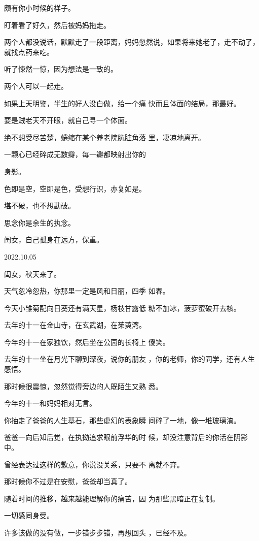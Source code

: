 \documentclass{article}
\begin{document}
颇有你小时候的样子。 


盯着看了好久，然后被妈妈拖走。 

两个人都没说话，默默走了一段距离，妈妈忽然说，如果将来她老了，走不动了，就找点药来吃。


听了悚然一惊，因为想法是一致的。 


两个人可以一起走。 

如果上天明鉴，半生的好人没白做，给一个痛
快而且体面的结局，那最好。 


要是贼老天不开眼，就自己寻一个体面。 

绝不想受尽苦楚，蜷缩在某个养老院肮脏角落
里，凄凉地离开。 

一颗心已经碎成无数瓣，每一瓣都映射出你的

\newpage
身影。 

色即是空，空即是色，受想行识，亦复如是。


堪不破，也不想勘破。 


思念你是余生的执念。 


闺女，自己孤身在远方，保重。 



2022.10.05 


闺女，秋天来了。 

天气忽冷忽热，你那里一定是风和日丽，四季
如春。 

今天小雏菊配向日葵还有满天星，杨枝甘露低
糖不加冰，菠萝蜜破开去核。 

去年的十一在金山寺，在玄武湖，在茱萸湾。
\newpage


今年的十一在家独饮，然后坐在公园的长椅上
傻笑。 

去年的十一坐在月光下聊到深夜，说你的朋友
，你的老师，你的同学，还有人生感悟。 

那时候很震惊，忽然觉得旁边的人既陌生又熟
悉。 


今年的十一和妈妈相对无言。 

你抽走了爸爸的人生基石，那些虚幻的表象瞬
间碎了一地，像一堆玻璃渣。 

爸爸一向后知后觉，在执拗追求眼前浮华的时
候，却没注意背后的你活在阴影中。 

曾经表达过这样的歉意，你说没关系，只要不
离就不弃。 

\newpage


那时候你不过是在安慰，爸爸却当真了。 

随着时间的推移，越来越能理解你的痛苦，因
为那些黑暗正在复制。 


一切感同身受。 

许多该做的没有做，一步错步步错，再想回头
，已经不及。 
\end{document}
